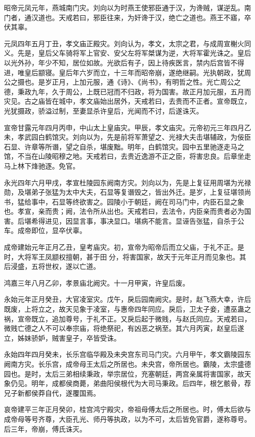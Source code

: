 \documentclass[]{article}
\begin{document}
昭帝元凤元年，燕城南门灾。刘向以为时燕王使邪臣通于汉，为谗贼，谋逆乱。南门者，通汉道也。天戒若曰，邪臣往来，为奸谗于汉，绝亡之道也。燕王不寤，卒伏其辜。

元凤四年五月丁丑，孝文庙正殿灾。刘向认为，孝文，太宗之君，与成周宣榭火同义。先是，皇后父车骑将军上官安、安父左将军桀谋为逆，大将军霍光诛之。皇后以光外孙，年少不知，居位如故。光欲后有子，因上待疾医言，禁内后宫皆不得进，唯皇后颛寝。皇后年六岁而立，十三年而昭帝崩，遂绝继嗣。光执朝政，犹周公之摄也。是岁正月，上加元服，通《诗》、《尚书》，有明哲之性。光亡周公之德，秉政九年，久于周公，上既已冠而不归政，将为国害。故正月加元服，五月而灾见。古之庙皆在城中，孝文庙始出居外，天戒若曰，去贵而不正者。宣帝既立，光犹摄政，骄溢过制，至妻显杀许皇后，光闻而不讨，后遂诛灭。

宣帝甘露元年四月丙申，中山太上皇庙灾。甲辰，孝文庙灾。元帝初元三年四月乙未，孝武园白鹤馆灾。刘向以为，先是前将军萧望之、光禄大夫击堪辅政，为佞臣石显、许章等所谮，望之自杀，堪废黜。明年，白鹤馆灾。园中五里驰逐走马之馆，不当在山陵昭穆之地。天戒若曰，去贵近逸游不正之臣，将害忠良。后章坐走马上林下烽驰逐。免官。

永光四年六月甲戌，孝宣杜陵园东阙南方灾。刘向以为，先是上复征用周堪为光禄勋，及堪弟子张猛为太中大夫，石显等复谮毁之，皆出外迁。是岁，上复征堪领尚书，猛给事中，石显等终欲害之。园陵小于朝廷，阙在司马门中，内臣石显之象也。孝宣，亲而贵；阙，法令所从出也。天戒若曰，去法令，内臣亲而贵者必为国害。后堪希得进见，因显言事，事决显口。堪病不能言。显诬告张猛，自杀于公车。成帝即位，显卒伏辜。

成帝建始元年正月乙丑，皇考庙灾。初，宣帝为昭帝后而立父庙，于礼不正。是时，大将军王凤颛权擅朝，甚于田分，将害国家，故天于元年正月而见象也。其后浸盛，五将世权，遂以亡道。

鸿嘉三年八月乙卯，孝景庙北阙灾。十一月甲寅，许皇后废。

永始元年正月癸丑，大官凌室灾。戊午，戾后园南阙灾。是时，赵飞燕大幸，许后既废，上将立之，故天见象于凌室，与惠帝四年同应。戾后，卫太子妾，遭巫蛊之祸，宣帝既立，追加尊号，于礼不正。又戾后起于微贱，与赵氏同应。天戒若曰，微贱亡德之人不可以奉宗庙，将绝祭祀，有凶恶之祸至。其六月丙寅，赵皇后遂立，姊妹骄妒，贼害皇子，卒皆受诛。

永始四年四月癸未，长乐宫临华殿及未央宫东司马门灾。六月甲午，孝文霸陵园东阙南方灾。长乐宫，成帝母王太后之所居也。未央宫，帝所居也。霸陵，太宗盛德园也。是时，太后三弟相续秉政，举宗居位，充塞朝廷，两宫亲属将害国家，故天象仍见。明年，成都侯商薨，弟曲阳侯根代为大司马秉政。后四年，根乞骸骨，荐兄子新都侯莽自代，遂覆国焉。

哀帝建平三年正月癸卯，桂宫鸿宁殿灾，帝祖母傅太后之所居也。时，傅太后欲与成帝母等号齐尊，大臣孔光、师丹等执政，以为不可，太后皆免官爵，遂称尊号。后三年，帝崩，傅氏诛灭。
\end{document}
